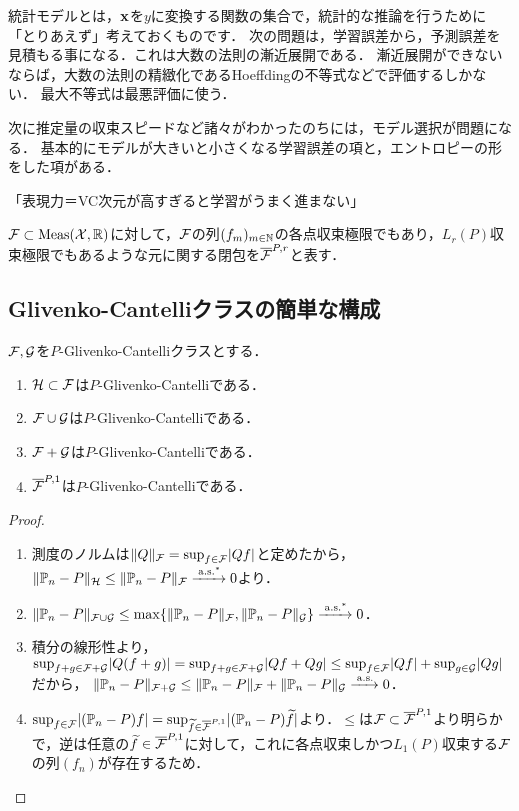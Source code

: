 \documentclass[uplatex,dvipdfmx]{jsreport}
\begin{document}
\begin{tcolorbox}[colframe=ForestGreen, colback=ForestGreen!10!white,breakable,colbacktitle=ForestGreen!40!white,coltitle=black,fonttitle=\bfseries\sffamily,
title=]
    統計モデルとは，$\mathbf{x}$を$y$に変換する関数の集合で，統計的な推論を行うために「とりあえず」考えておくものです．
    次の問題は，学習誤差から，予測誤差を見積もる事になる．これは大数の法則の漸近展開である．
    漸近展開ができないならば，大数の法則の精緻化であるHoeffdingの不等式などで評価するしかない．
    最大不等式は最悪評価に使う．

    次に推定量の収束スピードなど諸々がわかったのちには，モデル選択が問題になる．
    基本的にモデルが大きいと小さくなる学習誤差の項と，エントロピーの形をした項がある．

    「表現力＝VC次元が高すぎると学習がうまく進まない」
\end{tcolorbox}

\begin{notation}
    $\mathcal{F}\subset\mathrm{Meas}(\mathcal{X},\mathbb{R})$に対して，$\mathcal{F}$の列$(f_m)_{m\in\mathbb{N}}$の各点収束極限でもあり，$L_r(P)$収束極限でもあるような元に関する閉包を$\overline{\mathcal{F}}^{P,r}$と表す．
\end{notation}

\subsection{Glivenko-Cantelliクラスの簡単な構成}

\begin{proposition}
    $\mathcal{F},\mathcal{G}$を$P$-Glivenko-Cantelliクラスとする．
    \begin{enumerate}
        \item $\mathcal{H}\subset \mathcal{F}$は$P$-Glivenko-Cantelliである．
        \item $\mathcal{F}\cup\mathcal{G}$は$P$-Glivenko-Cantelliである．
        \item $\mathcal{F}+\mathcal{G}$は$P$-Glivenko-Cantelliである．
        \item $\overline{\mathcal{F}}^{P,1}$は$P$-Glivenko-Cantelliである．
    \end{enumerate}
\end{proposition}
\begin{proof}\mbox{}
    \begin{enumerate}
        \item 測度のノルムは$\|Q\|_{\mathcal{F}}=\sup_{f\in\mathcal{F}}\lvert Qf\rvert$と定めたから，
        $\|\mathbb{P}_n-P\|_{\mathcal{H}}\le\|\mathbb{P}_n-P\|_{\mathcal{F}}\xrightarrow{\;\mathrm{a.s.}^*}0$より．
        \item $\|\mathbb{P}_n-P\|_{\mathcal{F}\cup\mathcal{G}}\le\max\{\|\mathbb{P}_n-P\|_{\mathcal{F}},\|\mathbb{P}_n-P\|_{\mathcal{G}}\}\xrightarrow{\;\mathrm{a.s.}^*}0$．
        \item 積分の線形性より，$\sup_{f+g\in\mathcal{F}+\mathcal{G}}\lvert Q(f+g)\rvert=\sup_{f+g\in\mathcal{F}+\mathcal{G}}\lvert Qf+Qg\rvert\le\sup_{f\in\mathcal{F}}\lvert Qf\rvert+\sup_{g\in\mathcal{G}}\lvert Qg\rvert$だから，
        $\|\mathbb{P}_n-P\|_{\mathcal{F}+\mathcal{G}}\le\|\mathbb{P}_n-P\|_{\mathcal{F}}+\|\mathbb{P}_n-P\|_{\mathcal{G}}\xrightarrow{\;\mathrm{a.s.}}0$．
        \item $\sup_{f\in\mathcal{F}}\lvert(\mathbb{P}_n-P)f\rvert=\sup_{\widetilde{f}\in\overline{\mathcal{F}}^{P,1}}\lvert(\mathbb{P}_n-P)\widetilde{f}\rvert$より．$\le$は$\mathcal{F}\subset\overline{\mathcal{F}}^{P,1}$より明らかで，逆は任意の$\widetilde{f}\in \overline{\mathcal{F}}^{P,1}$に対して，これに各点収束しかつ$L_1(P)$収束する$\mathcal{F}$の列$(f_n)$が存在するため．
    \end{enumerate}
\end{proof}
\end{document}
